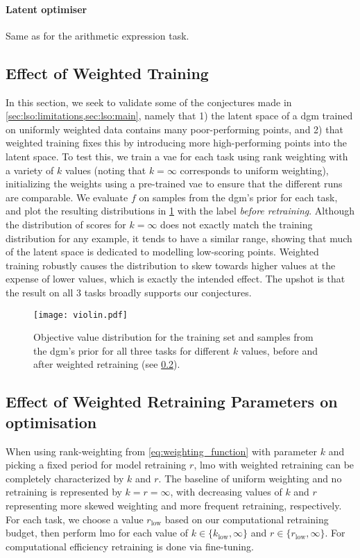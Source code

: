 \paragraph{Latent optimiser} Same as for the arithmetic expression task.


\subsection{Effect of Weighted Training}
\label{subsec:expt-weighting}
In this section, we seek to validate some of the conjectures made in \cref{sec:lso:limitations,sec:lso:main},
namely that 1) the latent space of a \gls{dgm} trained on uniformly weighted data contains many poor-performing points, and 2) that weighted training fixes this by introducing more high-performing points into the latent space.
To test this, we train a \gls{vae} for each task using rank weighting with a variety of $k$ values (noting that $k=\infty$ corresponds to uniform weighting), initializing the weights using a pre-trained \gls{vae} to ensure that the different runs are comparable.
We evaluate $f$ on samples from the \gls{dgm}'s prior for each task, and plot the resulting distributions in \cref{fig:prior-samples} with the label \emph{before retraining}.
Although the distribution of scores for $k=\infty$ does not exactly match the training distribution
for any example, it tends to have a similar range, showing that much of the latent space is dedicated to modelling low-scoring points.
Weighted training robustly causes the distribution to skew towards higher values at the expense of lower values, which is exactly the intended effect.
The upshot is that the result on all 3 tasks broadly supports our conjectures.

\begin{figure}[ht]
    \centering
    \texttt{[image: violin.pdf]}
    \caption[Prior samples from the \gls{dgm}'s prior for all tasks.]{
    Objective value distribution for the training set and samples from the \gls{dgm}'s prior
    for all three tasks for different $k$ values,
    before and after weighted retraining (see \cref{subsec:expt-wr}).
    }
    \label{fig:prior-samples}
\end{figure}


\subsection{Effect of Weighted Retraining Parameters on optimisation}
\label{subsec:expt-wr}
When using rank-weighting from \cref{eq:weighting_function} with parameter $k$ and picking a fixed period for model retraining $r$,
\gls{lmo} with weighted retraining can be completely characterized by $k$ and $r$.
The baseline of uniform weighting and no retraining is represented by $k=r=\infty$,
with decreasing values of $k$ and $r$ representing more skewed weighting and more frequent retraining, respectively.
For each task, we choose a value $r_\text{low}$ based on our computational retraining budget,
then perform \gls{lmo} for each value of 
$k\in\{k_{\text{low}}, \infty \}$ and $r\in\{r_{\text{low}}, \infty \}$.
For computational efficiency retraining is done via fine-tuning.

